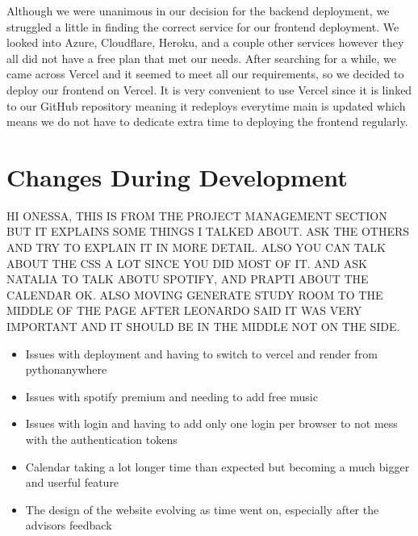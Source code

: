 Although we were unanimous in our decision for the backend deployment, we struggled a little in finding the correct service for our frontend deployment. We looked into Azure, Cloudflare, Heroku, and a couple other services however they all did not have a free plan that met our needs. After searching for a while, we came across Vercel and it seemed to meet all our requirements, so we decided to deploy our frontend on Vercel. It is very convenient to use Vercel since it is linked to our GitHub repository meaning it redeploys everytime main is updated which means we do not have to dedicate extra time to deploying the frontend regularly.



\section{Changes During Development}
\label{sect:changes-during-development}

HI ONESSA, THIS IS FROM THE PROJECT MANAGEMENT SECTION BUT IT EXPLAINS SOME THINGS I TALKED ABOUT. ASK THE OTHERS AND TRY TO EXPLAIN IT IN MORE DETAIL. ALSO YOU CAN TALK ABOUT THE CSS A LOT SINCE YOU DID MOST OF IT. AND ASK NATALIA TO TALK ABOTU SPOTIFY, AND PRAPTI ABOUT THE CALENDAR OK. ALSO MOVING GENERATE STUDY ROOM TO THE MIDDLE OF THE PAGE AFTER LEONARDO SAID IT WAS VERY IMPORTANT AND IT SHOULD BE IN THE MIDDLE NOT ON THE SIDE.
\begin{itemize}
    \item Issues with deployment and having to switch to vercel and render from pythonanywhere
    \item Issues with spotify premium and needing to add free music
    \item Issues with login and having to add only one login per browser to not mess with the authentication tokens
    \item Calendar taking a lot longer time than expected but becoming a much bigger and userful feature
    \item The design of the website evolving as time went on, especially after the advisors feedback
\end{itemize}